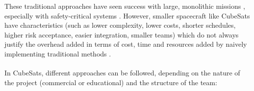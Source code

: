 \documentclass[]{iac}
\begin{document}
    These traditional approaches have seen success with large, monolithic missions \autocite{shea_nasa_2017, HEEAGER201822}, especially with safety-critical systems \autocite{kasauli_safety-critical_2018}. However, smaller spacecraft like CubeSats have characteristics (such as lower complexity, lower costs, shorter schedules, higher risk acceptance, easier integration, smaller teams) which do not always justify the overhead added in terms of cost, time and resources added by naively implementing traditional methods \autocite{carson_421_2013,yassine_information_2003,royce_managing_1970,sebok}. 

    \paragraph{}

    In CubeSats, different approaches can be followed, depending on the nature of the project (commercial or educational) and the structure of the team:
\end{document}
